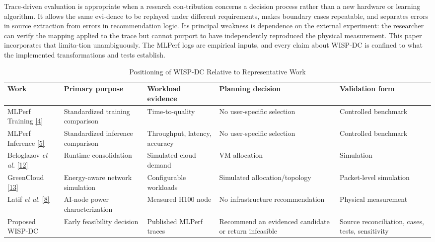 \documentclass[final,3p,12pt,nopreprintline]{elsarticle}
\newcommand{\framework}{WISP-DC}
\begin{document}
Trace-driven evaluation is appropriate when a research con-tribution concerns a decision process rather than a new hardware or learning algorithm. It allows the same evi-dence to be replayed under different requirements, makes boundary cases repeatable, and separates errors in source extraction from errors in recommendation logic. Its principal weakness is dependence on the external experiment: the researcher can verify the mapping applied to the trace but cannot purport to have independently reproduced the physical measurement. This paper incorporates that limita-tion unambiguously. The MLPerf logs are empirical inputs, and every claim about WISP-DC is confined to what the implemented transformations and tests establish.


\begin{table}[htbp]
\caption{Positioning of \framework{} Relative to Representative Work}
\label{tab:positioning}
\centering
\footnotesize
\setlength{\tabcolsep}{3pt}
\renewcommand{\arraystretch}{1.12}
\begin{tabularx}{\textwidth}{p{2.8cm}XXXX}
\toprule
\textbf{Work} & \textbf{Primary purpose} & \textbf{Workload evidence} & \textbf{Planning decision} & \textbf{Validation form} \\
\midrule
MLPerf Training \hyperref[ref:4]{[4]} & Standardized training comparison & Time-to-quality & No user-specific selection & Controlled benchmark \\
MLPerf Inference \hyperref[ref:5]{[5]} & Standardized inference comparison & Throughput, latency, accuracy & No user-specific selection & Controlled benchmark \\
Beloglazov \emph{et al.} \hyperref[ref:12]{[12]} & Runtime consolidation & Simulated cloud demand & VM allocation & Simulation \\
GreenCloud \hyperref[ref:13]{[13]} & Energy-aware network simulation & Configurable workloads & Simulated allocation/topology & Packet-level simulation \\
Latif \emph{et al.} \hyperref[ref:8]{[8]} & AI-node power characterization & Measured H100 node & No infrastructure recommendation & Physical measurement \\
Proposed \framework{} & Early feasibility decision & Published MLPerf traces & Recommend an evidenced candidate or return infeasible & Source reconciliation, cases, tests, sensitivity \\
\bottomrule
\end{tabularx}
\end{table}
\end{document}
